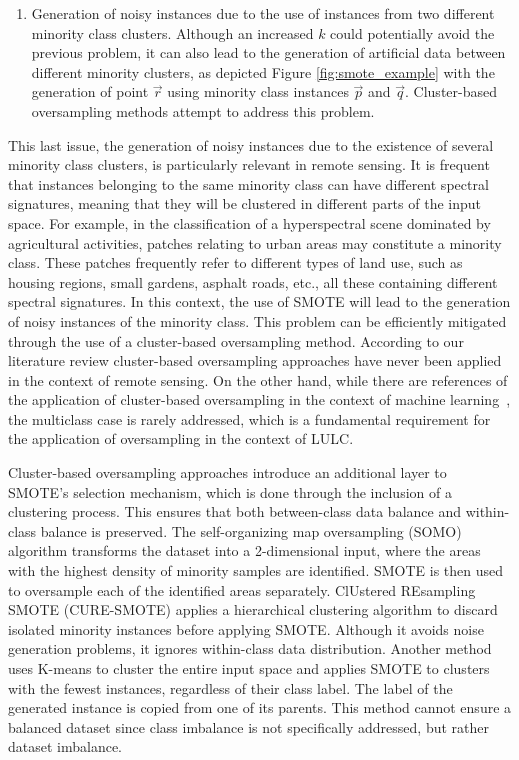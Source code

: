 \documentclass[information,article,submit,moreauthors,pdftex]{Definitions/mdpi}
\begin{document}
\begin{paracol}{2}
\begin{enumerate}
    \item Generation of noisy instances due to the use of
        instances from two different minority class clusters.
        Although an increased $k$ could potentially avoid the previous
        problem, it can also lead to the generation of artificial data between
        different minority clusters, as depicted Figure
        \ref{fig:smote_example} with the generation of point
        $\overrightarrow{r}$ using minority class instances $\overrightarrow{p}$ and $\overrightarrow{q}$.
        Cluster-based oversampling methods attempt to address this problem. 
\end{enumerate}

This last issue, the generation of noisy instances due to the existence of
several minority class clusters, is particularly relevant in remote sensing.
It is frequent that instances belonging to the same minority class can have
different spectral signatures, meaning that they will be clustered in
different parts of the input space. For example, in the classification of a
hyperspectral scene dominated by agricultural activities, patches relating to
urban areas may constitute a minority class. These patches frequently refer to
different types of land use, such as housing regions, small gardens, asphalt
roads, etc., all these containing different spectral signatures. In this
context, the use of SMOTE will lead to the generation of noisy instances of
the minority class. This problem can be efficiently mitigated through the use
of a cluster-based oversampling method. According to our literature review
cluster-based oversampling approaches have never been applied in the context
of remote sensing. On the other hand, while there are references of the
application of cluster-based oversampling in the context of machine
learning~\citep{Santos2015, Douzas2017, Ma2017, Douzas2018}, the multiclass
case is rarely addressed, which is a fundamental requirement for the
application of oversampling in the context of LULC. 

Cluster-based oversampling approaches introduce an additional layer to SMOTE's
selection mechanism, which is done through the inclusion of a clustering
process. This ensures that both between-class data balance and
within-class balance is preserved. The
self-organizing map oversampling (SOMO) \citep{Douzas2017} algorithm transforms
the dataset into a 2-dimensional input, where the areas with the highest
density of minority samples are identified. SMOTE is then used to oversample
each of the identified areas separately. ClUstered REsampling SMOTE
(CURE-SMOTE) \citep{Ma2017} applies a hierarchical clustering
algorithm to discard isolated minority instances before applying SMOTE.
Although it avoids noise generation problems, it ignores within-class data
distribution. Another method \citep{Santos2015} uses K-means to cluster the
entire input space and applies SMOTE to clusters with the fewest
instances, regardless of their class label. The label of the
generated instance is copied from one of its parents.
This method cannot ensure a balanced dataset since class imbalance is not
specifically addressed, but rather dataset imbalance.

\end{paracol}
\end{document}
